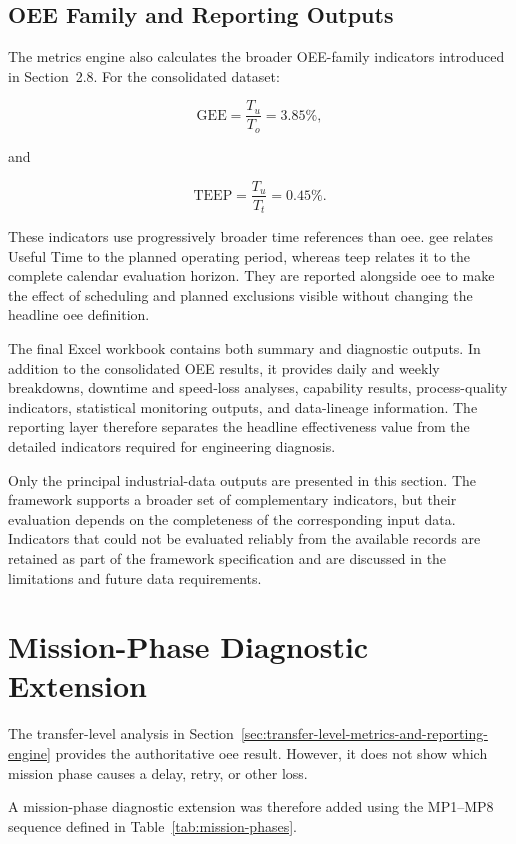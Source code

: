 \subsection{OEE Family and Reporting Outputs}
The metrics engine also calculates the broader OEE-family indicators introduced in Section~2.8. For the consolidated dataset:

$$
\mathrm{GEE} = \frac{T_u}{T_o} = 3.85\%,
$$

and

$$
\mathrm{TEEP} = \frac{T_u}{T_t} = 0.45\%.
$$

These indicators use progressively broader time references than \acrshort{oee}. \acrshort{gee} relates Useful Time to the planned operating period, whereas \acrshort{teep} relates it to the complete calendar evaluation horizon. They are reported alongside \acrshort{oee} to make the effect of scheduling and planned exclusions visible without changing the headline \acrshort{oee} definition.

The final Excel workbook contains both summary and diagnostic outputs. In addition to the consolidated OEE results, it provides daily and weekly breakdowns, downtime and speed-loss analyses, capability results, process-quality indicators, statistical monitoring outputs, and data-lineage information. The reporting layer therefore separates the headline effectiveness value from the detailed indicators required for engineering diagnosis.

Only the principal industrial-data outputs are presented in this section. The framework supports a broader set of complementary indicators, but their evaluation depends on the completeness of the corresponding input data. Indicators that could not be evaluated reliably from the available records are retained as part of the framework specification and are discussed in the limitations and future data requirements.

\section{Mission-Phase Diagnostic Extension}
\label{sec:mission-phase-diagnostic-extension}
The transfer-level analysis in Section~\ref{sec:transfer-level-metrics-and-reporting-engine} provides the authoritative \gls{oee} result. However, it does not show which mission phase causes a delay, retry, or other loss.

A mission-phase diagnostic extension was therefore added using the MP1--MP8 sequence defined in Table~\ref{tab:mission-phases}.


